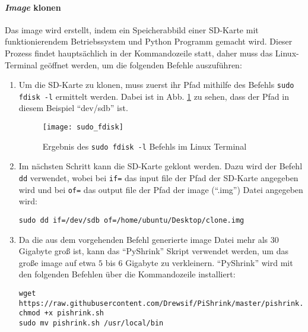 \paragraph{\textit{Image} klonen}
Das \gls{image} wird erstellt, indem ein Speicherabbild einer SD-Karte mit funktionierendem Betriebssystem und Python Programm gemacht wird. Dieser Prozess findet hauptsächlich in der Kommandozeile statt, daher muss das Linux-Terminal geöffnet werden, um die folgenden Befehle auszuführen:
\begin{enumerate}

    \item Um die SD-Karte zu klonen, muss zuerst ihr Pfad mithilfe des Befehls \texttt{sudo fdisk -l} ermittelt werden. Dabei ist in Abb. \ref{fig:sudo_fdisk} zu sehen, dass der Pfad in diesem Beispiel \enquote{dev/sdb} ist.
    \begin{figure}[H]
        \centering
        \texttt{[image: sudo\_fdisk]}
        \caption{Ergebnis des \texttt{sudo fdisk -l} Befehls im Linux Terminal}
        \label{fig:sudo_fdisk}
    \end{figure}
    
    \item Im nächsten Schritt kann die SD-Karte geklont werden. Dazu wird der Befehl \texttt{dd} verwendet, wobei bei \texttt{if=} das input file \bzw der Pfad der SD-Karte angegeben wird und bei \texttt{of=} das output file \bzw der Pfad der \gls{image} (\enquote{.img}) Datei angegeben wird:
    \begin{verbatim}
sudo dd if=/dev/sdb of=/home/ubuntu/Desktop/clone.img
    \end{verbatim}

    \item Da die aus dem vorgehenden Befehl generierte \gls{image} Datei mehr als $30$ Gigabyte groß ist, kann das \enquote{PyShrink} Skript verwendet werden, um das große  \gls{image} auf etwa $5$ bis $6$ Gigabyte zu verkleinern. \enquote{PyShrink} wird mit den folgenden Befehlen über die Kommandozeile installiert:
    \begin{verbatim}
wget https://raw.githubusercontent.com/Drewsif/PiShrink/master/pishrink.sh
chmod +x pishrink.sh
sudo mv pishrink.sh /usr/local/bin
    \end{verbatim}


\end{enumerate}
